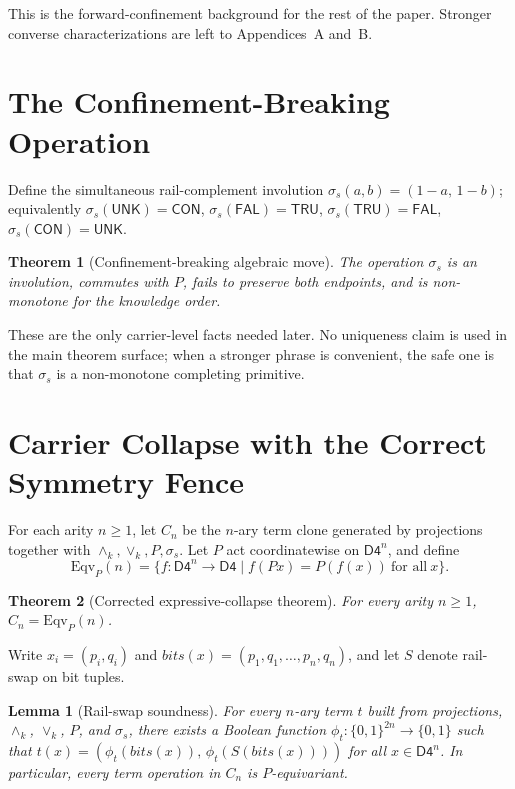 \documentclass[11pt]{article}
\newtheorem{theorem}{Theorem}
\newtheorem{lemma}{Lemma}
\theoremstyle{remark}
\newcommand{\Dfour}{\ensuremath{\mathsf{D4}}}
\newcommand{\UNK}{\ensuremath{\mathsf{UNK}}}
\newcommand{\FAL}{\ensuremath{\mathsf{FAL}}}
\newcommand{\TRU}{\ensuremath{\mathsf{TRU}}}
\newcommand{\CON}{\ensuremath{\mathsf{CON}}}
\newcommand{\meetk}{\ensuremath{\wedge_k}}
\newcommand{\joink}{\ensuremath{\vee_k}}
\newcommand{\Eqv}{\mathrm{Eqv}}
\newcommand{\bits}{\mathit{bits}}
\begin{document}
This is the forward-confinement background for the rest of the paper.
Stronger converse characterizations are left to Appendices~A and~B.

\section{The Confinement-Breaking Operation}

Define the simultaneous rail-complement involution
$\sigma_s(a,b)=(1-a,\,1-b)$; equivalently $\sigma_s(\UNK)=\CON$,
$\sigma_s(\FAL)=\TRU$, $\sigma_s(\TRU)=\FAL$, $\sigma_s(\CON)=\UNK$.

\begin{theorem}[Confinement-breaking algebraic move]\label{thm:sigma}
The operation $\sigma_s$ is an involution, commutes with $P$, fails to
preserve both endpoints, and is non-monotone for the knowledge order.
\end{theorem}

These are the only carrier-level facts needed later. No uniqueness claim is
used in the main theorem surface; when a stronger phrase is convenient, the
safe one is that $\sigma_s$ is a non-monotone completing primitive.

\section{Carrier Collapse with the Correct Symmetry Fence}

For each arity $n\ge 1$, let $C_n$ be the $n$-ary term clone generated by
projections together with $\meetk,\joink,P,\sigma_s$. Let $P$ act
coordinatewise on $\Dfour^n$, and define
\[
\Eqv_P(n)=\{f:\Dfour^n\to\Dfour \mid f(Px)=P(f(x))\ \text{for all}\ x\}.
\]

\begin{theorem}[Corrected expressive-collapse theorem]\label{thm:collapse}
For every arity $n\ge 1$, $C_n=\Eqv_P(n)$.
\end{theorem}

Write $x_i=(p_i,q_i)$ and $\bits(x)=(p_1,q_1,\dots,p_n,q_n)$, and let $S$
denote rail-swap on bit tuples.

\begin{lemma}[Rail-swap soundness]\label{lem:soundness}
For every $n$-ary term $t$ built from projections, $\meetk$, $\joink$, $P$,
and $\sigma_s$, there exists a Boolean function
$\phi_t:\{0,1\}^{2n}\to\{0,1\}$ such that
$t(x)=(\phi_t(\bits(x)),\,\phi_t(S(\bits(x))))$ for all $x\in\Dfour^n$. In
particular, every term operation in $C_n$ is $P$-equivariant.
\end{lemma}
\end{document}
